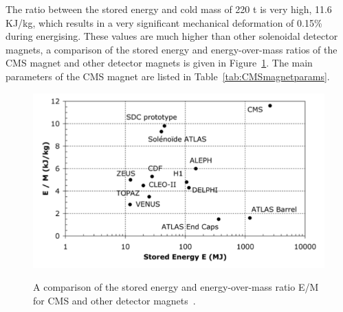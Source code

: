 The ratio between the stored energy and cold mass of 220 t is very high, 11.6 KJ/kg, which results in a very significant mechanical deformation of 0.15\% during energising.  These values are much higher than other solenoidal detector magnets, a comparison of the stored energy and energy-over-mass ratios of the CMS magnet and other detector magnets is given in Figure~\ref{figapp:CMSstoredenergy}.  The main parameters of the CMS magnet are listed in Table~\ref{tab:CMSmagnetparams}.


\begin{figure}[!Hh]
       \centering
       \includegraphics[scale=0.4]{Figures/CMSstoredenergy.png} \\
       \caption[The stored energy of CMS and other detector magnets.]{A comparison of the stored energy and energy-over-mass ratio E/M for CMS and other detector magnets~\cite{CMSdetector}.}
\label{figapp:CMSstoredenergy}
\end{figure}



